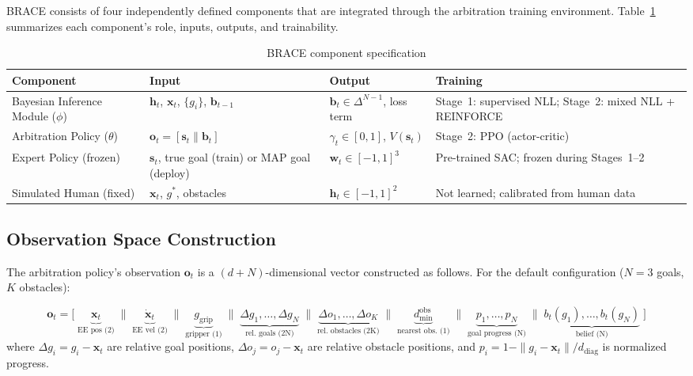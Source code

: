 \documentclass[11pt]{article}
\newcommand{\bvec}{\mathbf{b}_t}
\newcommand{\svec}{\mathbf{s}_t}
\newcommand{\hvec}{\mathbf{h}_t}
\newcommand{\wvec}{\mathbf{w}_t}
\begin{document}
BRACE consists of four independently defined components that are integrated through the arbitration training environment.  Table~\ref{tab:components} summarizes each component's role, inputs, outputs, and trainability.

\begin{table}[h]
\centering
\caption{BRACE component specification}
\label{tab:components}
\small
\begin{tabular}{@{}p{3.2cm}p{3.0cm}p{3.5cm}p{3.2cm}@{}}
\toprule
\textbf{Component} & \textbf{Input} & \textbf{Output} & \textbf{Training} \\
\midrule
Bayesian Inference Module ($\phi$)
& $\hvec$, $\mathbf{x}_t$, $\{g_i\}$, $\mathbf{b}_{t-1}$
& $\bvec \in \Delta^{N-1}$, loss term
& Stage~1: supervised NLL; Stage~2: mixed NLL + REINFORCE \\
\addlinespace
Arbitration Policy ($\theta$)
& $\mathbf{o}_t = [\svec \| \bvec]$
& $\gamma_t \in [0,1]$, $V(\svec)$
& Stage~2: PPO (actor-critic) \\
\addlinespace
Expert Policy (frozen)
& $\svec$, true goal (train) or MAP goal (deploy)
& $\wvec \in [-1,1]^3$
& Pre-trained SAC; frozen during Stages~1--2 \\
\addlinespace
Simulated Human (fixed)
& $\mathbf{x}_t$, $g^*$, obstacles
& $\hvec \in [-1,1]^2$
& Not learned; calibrated from human data \\
\bottomrule
\end{tabular}
\end{table}


\subsection{Observation Space Construction}

The arbitration policy's observation $\mathbf{o}_t$ is a $(d + N)$-dimensional vector constructed as follows.
For the default configuration ($N = 3$ goals, $K$ obstacles):

\begin{equation}
    \mathbf{o}_t = \bigl[\;
    \underbrace{\mathbf{x}_t}_{\text{EE pos (2)}} \;\big\|\;
    \underbrace{\dot{\mathbf{x}}_t}_{\text{EE vel (2)}} \;\big\|\;
    \underbrace{g_{\text{grip}}}_{\text{gripper (1)}} \;\big\|\;
    \underbrace{\Delta g_1, \ldots, \Delta g_N}_{\text{rel. goals (2N)}} \;\big\|\;
    \underbrace{\Delta o_1, \ldots, \Delta o_K}_{\text{rel. obstacles (2K)}} \;\big\|\;
    \underbrace{d_{\min}^{\text{obs}}}_{\text{nearest obs. (1)}} \;\big\|\;
    \underbrace{p_1, \ldots, p_N}_{\text{goal progress (N)}} \;\big\|\;
    \underbrace{b_t(g_1), \ldots, b_t(g_N)}_{\text{belief (N)}}
    \;\bigr]
    \label{eq:obs-full}
\end{equation}
where $\Delta g_i = g_i - \mathbf{x}_t$ are relative goal positions, $\Delta o_j = o_j - \mathbf{x}_t$ are relative obstacle positions, and $p_i = 1 - \|g_i - \mathbf{x}_t\| / d_{\text{diag}}$ is normalized progress.
\end{document}
